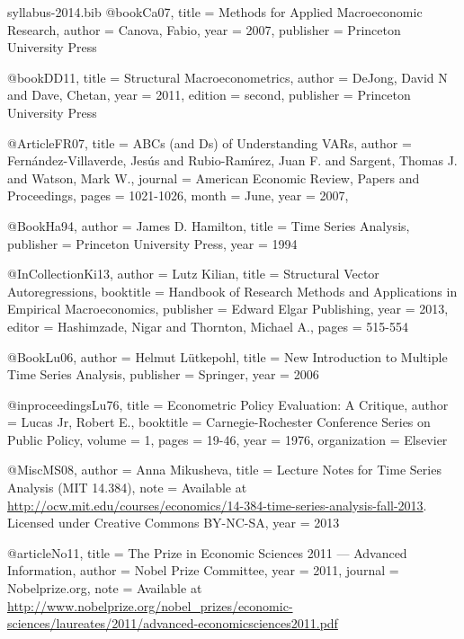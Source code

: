 \begin{filecontents}{syllabus-2014.bib}
@book{Ca07,
  title =	 {Methods for Applied Macroeconomic Research},
  author =	 {Canova, Fabio},
  year =	 2007,
  publisher =	 {Princeton University Press}
}

@book{DD11,
  title =	 {Structural Macroeconometrics},
  author =	 {DeJong, David N and Dave, Chetan},
  year =	 2011,
  edition =	 {second},
  publisher =	 {Princeton University Press}
}

@Article{FR07,
  title =	 {{ABC}s (and {D}s) of Understanding {VAR}s},
  author =	 {Fern{\'a}ndez-Villaverde, Jes{\'u}s and
                  Rubio-Ram{\'\i}rez, Juan F. and Sargent, Thomas
                  J. and Watson, Mark W.},
  journal =	 {American Economic Review, Papers and Proceedings},
  pages =	 {1021-1026},
  month =	 {June},
  year =	 2007,
}

@Book{Ha94,
  author =	 {James D. Hamilton},
  title =	 {Time Series Analysis},
  publisher =	 {Princeton University Press},
  year =	 1994
}

@InCollection{Ki13,
  author =	 {Lutz Kilian},
  title =	 {Structural {V}ector {A}utoregressions},
  booktitle =	 {Handbook of Research Methods and Applications in
                  Empirical Macroeconomics},
  publisher =	 {Edward Elgar Publishing},
  year =	 2013,
  editor =	 {Hashimzade, Nigar and Thornton, Michael A.},
  pages =	 {515-554}
}

@Book{Lu06,
  author =	 {Helmut L{\"u}tkepohl},
  title =	 {New Introduction to Multiple Time Series Analysis},
  publisher =	 {Springer},
  year =	 2006
}

@inproceedings{Lu76,
  title =	 {Econometric Policy Evaluation: A Critique},
  author =	 {Lucas Jr, Robert E.},
  booktitle =	 {Carnegie-Rochester Conference Series on Public
                  Policy},
  volume =	 1,
  pages =	 {19-46},
  year =	 1976,
  organization = {Elsevier}
}

@Misc{MS08,
  author =	 {Anna Mikusheva},
  title =	 {Lecture Notes for Time Series Analysis ({MIT}
                  14.384)},
  note =	 {Available at
                  \url{http://ocw.mit.edu/courses/economics/14-384-time-series-analysis-fall-2013}. Licensed
                  under Creative Commons BY-NC-SA},
  year =	 2013
}

@article{No11,
  title =	 {The Prize in Economic Sciences 2011 --- Advanced
                  Information},
  author =	 {{Nobel Prize Committee}},
  year =	 2011,
  journal =	 {Nobelprize.org},
  note =	 {Available at
                  \url{http://www.nobelprize.org/nobel_prizes/economic-sciences/laureates/2011/advanced-economicsciences2011.pdf}}
}


\end{filecontents}
